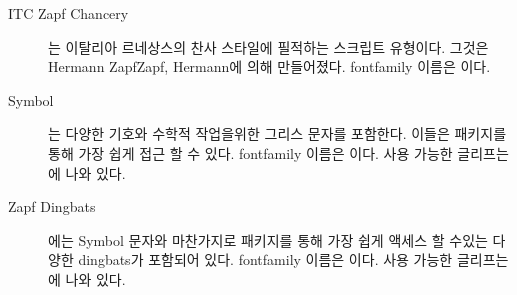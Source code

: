 \begin{description}
{\vspace{0.5\onelineskip}
\fox\par\Kafka\par\namesAZ
\vspace{0.5\onelineskip}
}


\item[ITC Zapf Chancery\facesubseeidx{Zapf Chancery}] { 는 이탈리아 르네상스의 찬사 스타일에 필적하는 스크립트 유형이다. 
그것은 Hermann Zapf{Zapf, Hermann}에 의해 만들어졌다. fontfamily 이름은 이다.

\vspace{0.5\onelineskip}
\fox\par\Kafka\par\namesAZ
\vspace{0.5\onelineskip}
}

\item[Symbol\facesubseeidx{Symbol}] { 는 다양한 기호와 수학적 작업을위한 그리스 문자를 포함한다. 
이들은  패키지를 통해 가장 쉽게 접근 할 수 있다. fontfamily 이름은 이다. 
사용 가능한 글리프는 에 나와 있다.
}

\item[Zapf Dingbats] { 에는 Symbol 문자와 마찬가지로  패키지를 통해 가장 쉽게 액세스 할 수있는 다양한 dingbats가 포함되어 있다. 
fontfamily 이름은 이다. 
  사용 가능한 글리프는 에 나와 있다.
}
\end{description}

